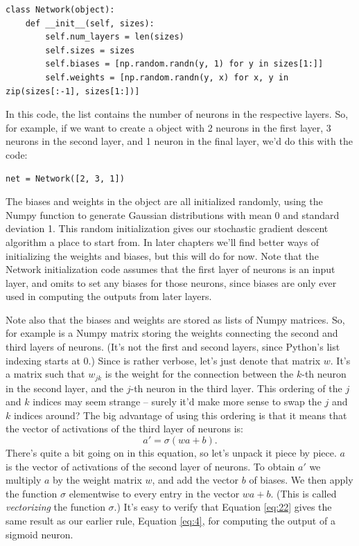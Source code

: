 \documentclass[a4paper,twoside,10pt]{book}
\begin{document}
\begin{lstlisting}
class Network(object):
	def __init__(self, sizes):
		self.num_layers = len(sizes)
		self.sizes = sizes
		self.biases = [np.random.randn(y, 1) for y in sizes[1:]]
		self.weights = [np.random.randn(y, x) for x, y in zip(sizes[:-1], sizes[1:])]
\end{lstlisting}
In this code, the list  contains the number of neurons in the respective layers. So, for example, if we want to create a  object with 2 neurons in the first layer, 3 neurons in the second layer, and 1 neuron in the final layer, we'd do this with the code:

\begin{lstlisting}
net = Network([2, 3, 1])
\end{lstlisting}
The biases and weights in the  object are all initialized randomly, using the Numpy  function to generate Gaussian distributions with mean 0 and standard deviation 1. This random initialization gives our stochastic gradient descent algorithm a place to start from. In later chapters we'll find better ways of initializing the weights and biases, but this will do for now. Note that the Network initialization code assumes that the first layer of neurons is an input layer, and omits to set any biases for those neurons, since biases are only ever used in computing the outputs from later layers.

Note also that the biases and weights are stored as lists of Numpy matrices. So, for example  is a Numpy matrix storing the weights connecting the second and third layers of neurons. (It's not the first and second layers, since Python's list indexing starts at 0.) Since  is rather verbose, let's just denote that matrix $w$. It's a matrix such that $w_{jk}$ is the weight for the connection between the $k$-th neuron in the second layer, and the $j$-th neuron in the third layer. This ordering of the $j$ and $k$ indices may seem strange -- surely it'd make more sense to swap the $j$ and $k$ indices around? The big advantage of using this ordering is that it means that the vector of activations of the third layer of neurons is:
\begin{equation}
	a' = \sigma(w a + b).
	\label{eq:22}
\end{equation}
There's quite a bit going on in this equation, so let's unpack it piece by piece. $a$ is the vector of activations of the second layer of neurons. To obtain $a'$ we multiply $a$ by the weight matrix $w$, and add the vector $b$ of biases. We then apply the function $\sigma$ elementwise to every entry in the vector $wa+b$. (This is called \textit{vectorizing} the function $\sigma$.) It's easy to verify that Equation \ref{eq:22} gives the same result as our earlier rule, Equation \ref{eq:4}, for computing the output of a sigmoid neuron.
\end{document}
